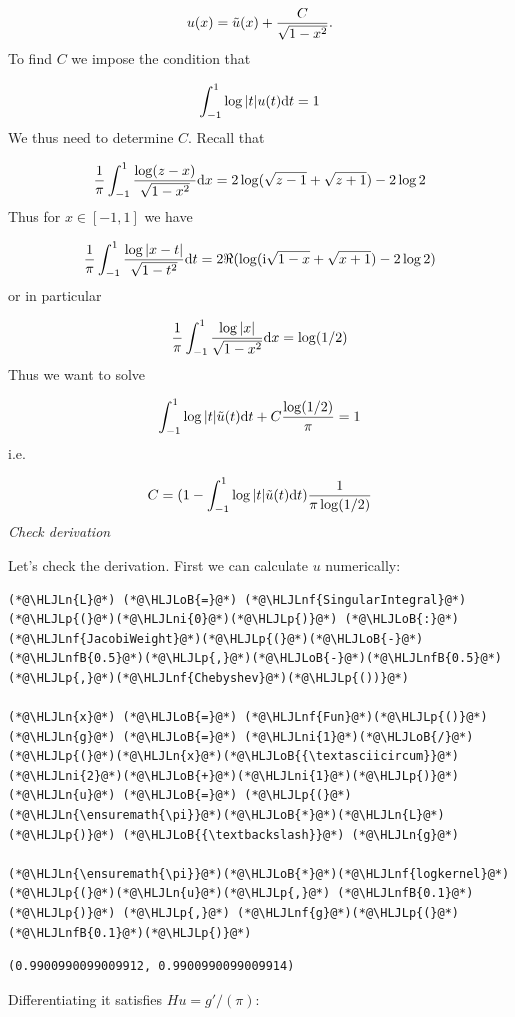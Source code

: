 \documentclass[12pt,a4paper]{article}
\newcommand{\HLJLn}[1]{#1}
\newcommand{\HLJLnf}[1]{\textcolor[RGB]{66,102,213}{#1}}
\newcommand{\HLJLnfB}[1]{\textcolor[RGB]{59,151,46}{#1}}
\newcommand{\HLJLni}[1]{\textcolor[RGB]{59,151,46}{#1}}
\newcommand{\HLJLoB}[1]{\textcolor[RGB]{102,102,102}{\textbf{#1}}}
\newcommand{\HLJLp}[1]{#1}
\def\D{ {\rm d} }
\def\I{ {\rm i} }
\def\dx{\D x}
\def\dt{\D t}
\begin{document}
\[
u(x) =  \tilde u(x) + {C \over \sqrt{1-x^2}}.
\]
To find $C$ we impose the condition that

\[
\int_{-1}^1 \log|t| u(t) \dt = 1
\]
We thus need to determine $C$. Recall that

\[
{1 \over \pi} \int_{-1}^1 {\log(z-x) \over \sqrt{1-x^2}} \dx = 2 \log(\sqrt{z-1}+\sqrt{z+1}) - 2 \log 2
\]
Thus for $x \in [-1,1]$ we have

\[
{1 \over \pi} \int_{-1}^1 {\log|x-t| \over \sqrt{1-t^2}} \dt = 2 \Re(\log(\I \sqrt{1-x}+\sqrt{x+1}) - 2 \log 2)
\]
or in particular 

\[
{1 \over \pi} \int_{-1}^1 {\log|x| \over \sqrt{1-x^2}} \dx = \log(1/2)
\]
Thus we want to solve

\[
\int_{-1}^1 \log|t| \tilde u(t) \dt + C {\log(1/2) \over \pi} = 1
\]
i.e.

\[
C = (1 - \int_{-1}^1 \log|t| \tilde u(t) \dt)  {1 \over  \pi \log(1/2)}
\]
\emph{Check derivation}

Let's check the derivation. First we can calculate $u$ numerically:


\begin{lstlisting}
(*@\HLJLn{L}@*) (*@\HLJLoB{=}@*) (*@\HLJLnf{SingularIntegral}@*)(*@\HLJLp{(}@*)(*@\HLJLni{0}@*)(*@\HLJLp{)}@*) (*@\HLJLoB{:}@*) (*@\HLJLnf{JacobiWeight}@*)(*@\HLJLp{(}@*)(*@\HLJLoB{-}@*)(*@\HLJLnfB{0.5}@*)(*@\HLJLp{,}@*)(*@\HLJLoB{-}@*)(*@\HLJLnfB{0.5}@*)(*@\HLJLp{,}@*)(*@\HLJLnf{Chebyshev}@*)(*@\HLJLp{())}@*)

(*@\HLJLn{x}@*) (*@\HLJLoB{=}@*) (*@\HLJLnf{Fun}@*)(*@\HLJLp{()}@*)
(*@\HLJLn{g}@*) (*@\HLJLoB{=}@*) (*@\HLJLni{1}@*)(*@\HLJLoB{/}@*)(*@\HLJLp{(}@*)(*@\HLJLn{x}@*)(*@\HLJLoB{{\textasciicircum}}@*)(*@\HLJLni{2}@*)(*@\HLJLoB{+}@*)(*@\HLJLni{1}@*)(*@\HLJLp{)}@*)
(*@\HLJLn{u}@*) (*@\HLJLoB{=}@*) (*@\HLJLp{(}@*)(*@\HLJLn{\ensuremath{\pi}}@*)(*@\HLJLoB{*}@*)(*@\HLJLn{L}@*)(*@\HLJLp{)}@*) (*@\HLJLoB{{\textbackslash}}@*) (*@\HLJLn{g}@*)

(*@\HLJLn{\ensuremath{\pi}}@*)(*@\HLJLoB{*}@*)(*@\HLJLnf{logkernel}@*)(*@\HLJLp{(}@*)(*@\HLJLn{u}@*)(*@\HLJLp{,}@*) (*@\HLJLnfB{0.1}@*)(*@\HLJLp{)}@*) (*@\HLJLp{,}@*) (*@\HLJLnf{g}@*)(*@\HLJLp{(}@*)(*@\HLJLnfB{0.1}@*)(*@\HLJLp{)}@*)
\end{lstlisting}

\begin{lstlisting}
(0.9900990099009912, 0.9900990099009914)
\end{lstlisting}


Differentiating it satisfies $H u = g'/(\pi)$:
\end{document}
